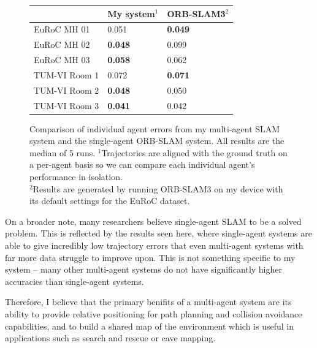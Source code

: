 \begin{figure}[h]
    \centering
    \def\arraystretch{1.2}
    \begin{tabular}{ |l|l|l| }
        \cline{2-3}
        \multicolumn{1}{c|}{} & My system$^1$  & ORB-SLAM3$^2$  \\
        \hline
        EuRoC MH 01           & 0.051          & \textbf{0.049} \\
        EuRoC MH 02           & \textbf{0.048} & 0.099          \\
        EuRoC MH 03           & \textbf{0.058} & 0.062          \\
        \hline
        TUM-VI Room 1         & 0.072          & \textbf{0.071} \\
        TUM-VI Room 2         & \textbf{0.048} & 0.050          \\
        TUM-VI Room 3         & \textbf{0.041} & 0.042          \\
        \hline
    \end{tabular}

    \caption{Comparison of individual agent errors from my multi-agent SLAM system and the single-agent ORB-SLAM system. All results are the median of 5 runs. \captionbreak $^1$Trajectories are aligned with the ground truth on a per-agent basis so we can compare each individual agent's performance in isolation. \\ $^2$Results are generated by running ORB-SLAM3 on my device with its default settings for the EuRoC dataset.}
    \label{fig:comparison-to-single-agent-systems}
\end{figure}

On a broader note, many researchers believe single-agent SLAM to be a solved problem. This is reflected by the results seen here, where single-agent systems are able to give incredibly low trajectory errors that even multi-agent systems with far more data struggle to improve upon. This is not something specific to my system – many other multi-agent systems do not have significantly higher accuracies than single-agent systems.

Therefore, I believe that the primary benifits of a multi-agent system are its ability to provide relative positioning for path planning and collision avoidance capabilities, and to build a shared map of the environment which is useful in applications such as search and rescue or cave mapping.

